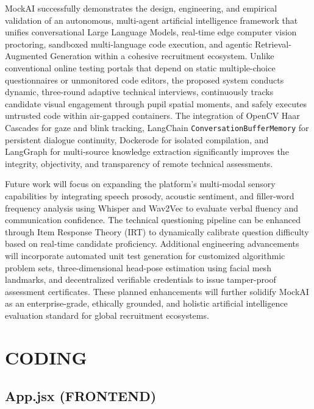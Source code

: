 \documentclass[12pt,a4paper]{report}
\begin{document}
MockAI successfully demonstrates the design, engineering, and empirical validation of an
autonomous, multi-agent artificial intelligence framework that unifies conversational Large
Language Models, real-time edge computer vision proctoring, sandboxed multi-language
code execution, and agentic Retrieval-Augmented Generation within a cohesive recruitment
ecosystem. Unlike conventional online testing portals that depend on static multiple-choice
questionnaires or unmonitored code editors, the proposed system conducts dynamic,
three-round adaptive technical interviews, continuously tracks candidate visual engagement
through pupil spatial moments, and safely executes untrusted code within air-gapped
containers. The integration of OpenCV Haar Cascades for gaze and blink tracking,
LangChain \texttt{ConversationBufferMemory} for persistent dialogue continuity, Dockerode
for isolated compilation, and LangGraph for multi-source knowledge extraction
significantly improves the integrity, objectivity, and transparency of remote technical
assessments.

Future work will focus on expanding the platform's multi-modal sensory capabilities by
integrating speech prosody, acoustic sentiment, and filler-word frequency analysis using
Whisper and Wav2Vec to evaluate verbal fluency and communication confidence. The
technical questioning pipeline can be enhanced through Item Response Theory (IRT) to
dynamically calibrate question difficulty based on real-time candidate proficiency.
Additional engineering advancements will incorporate automated unit test generation for
customized algorithmic problem sets, three-dimensional head-pose estimation using facial
mesh landmarks, and decentralized verifiable credentials to issue tamper-proof assessment
certificates. These planned enhancements will further solidify MockAI as an enterprise-grade,
ethically grounded, and holistic artificial intelligence evaluation standard for global
recruitment ecosystems.

\appendix
\chapter{CODING}

\section*{App.jsx (FRONTEND)}
\end{document}
